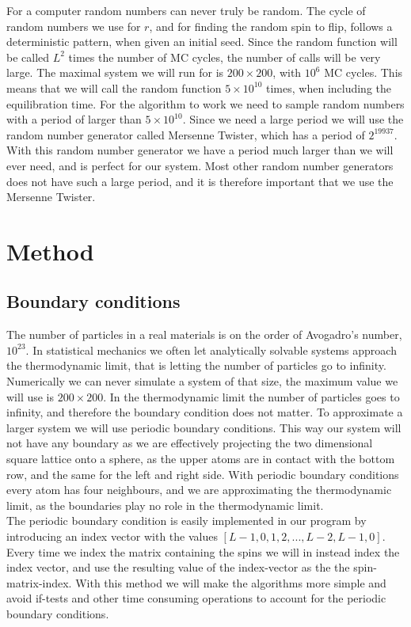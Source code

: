 \documentclass[%
 reprint,
nofootinbib,
aps,
]{revtex4-1}
\begin{document}
\par
For a computer random numbers can never truly be random. The cycle of random numbers we use for $r$, and for finding the random spin to flip, follows a deterministic pattern, when given an initial seed. Since the random function will be called $L^2$ times the number of MC cycles, the number of calls will be very large. The maximal system we will run for is $200\times 200$, with $10^{6}$ MC cycles. This means that we will call the random function $5\times 10^{10}$ times, when including the equilibration time. For the algorithm to work we need to sample random numbers with a period of larger than $5\times 10^{10}$. Since we need a large period we will use the random number generator called Mersenne Twister, which has a period of $2^{19937}$. With this random number generator we have a period much larger than we will ever need, and is perfect for our system. Most other random number generators does not have such a large period, and it is therefore important that we use the Mersenne Twister.

\section{Method}
\subsection{Boundary conditions}
The number of particles in a real materials is on the order of Avogadro's number, $10^{23}$. In statistical mechanics we often let analytically solvable systems approach the thermodynamic limit, that is letting the number of particles go to infinity. Numerically we can never simulate a system of that size, the maximum value we will use is $200\times 200$. In the thermodynamic limit the number of particles goes to infinity, and therefore the boundary condition does not matter. To approximate a larger system we will use periodic boundary conditions. This way our system will not have any boundary as we are effectively projecting the two dimensional square lattice onto a sphere, as the upper atoms are in contact with the bottom row, and the same for the left and right side. With periodic boundary conditions every atom has four neighbours, and we are approximating the thermodynamic limit, as the boundaries play no role in the thermodynamic limit. \\
The periodic boundary condition is easily implemented in our program by introducing an index vector with the values $[L-1, 0, 1, 2, ..., L-2, L-1, 0]$. Every time we index the matrix containing the spins we will in instead index the index vector, and use the resulting value of the index-vector as the the spin-matrix-index. With this method we will make the algorithms more simple and avoid if-tests and other time consuming operations to account for the periodic boundary conditions.
\end{document}
